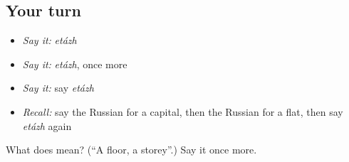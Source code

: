 \subsection*{Your turn}
\begin{itemize}
\raggedright
  \item \emph{Say it:} \emph{etázh}
  \item \emph{Say it:} \emph{etázh}, once more
  \item \emph{Say it:} say \emph{etázh}
  \item \emph{Recall:} say the Russian for a capital, then the Russian for a flat, then say \emph{etázh} again
\end{itemize}

\begin{tcolorbox}[breakable,colback=teal!4,colframe=teal!35!black,title={Before you move on}]
What does  mean? (\textquotedblleft{}A floor, a storey\textquotedblright{}.) Say it once more.
\end{tcolorbox}
